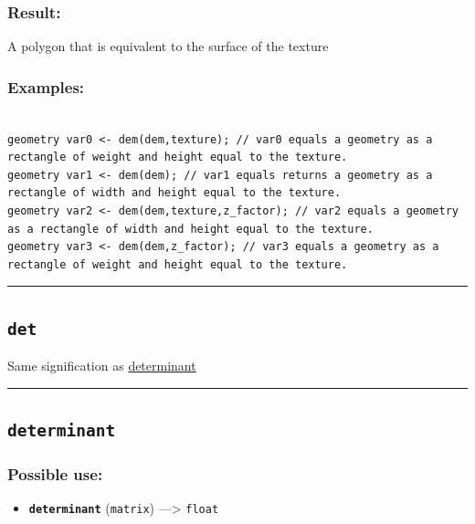 \documentclass[]{book}
\providecommand{\tightlist}{%
  \setlength{\itemsep}{0pt}\setlength{\parskip}{0pt}}
\theoremstyle{definition}
\theoremstyle{definition}
\theoremstyle{definition}
\theoremstyle{remark}
\begin{document}
\subsubsection{Result:}\label{result-124}

A polygon that is equivalent to the surface of the texture

\subsubsection{Examples:}\label{examples-98}

\begin{verbatim}
 
geometry var0 <- dem(dem,texture); // var0 equals a geometry as a rectangle of weight and height equal to the texture. 
geometry var1 <- dem(dem); // var1 equals returns a geometry as a rectangle of width and height equal to the texture. 
geometry var2 <- dem(dem,texture,z_factor); // var2 equals a geometry as a rectangle of width and height equal to the texture. 
geometry var3 <- dem(dem,z_factor); // var3 equals a geometry as a rectangle of weight and height equal to the texture.
\end{verbatim}

\begin{center}\rule{0.5\linewidth}{\linethickness}\end{center}

\subsection{\texorpdfstring{\texttt{det}}{det}}\label{det}

Same signification as
\href{operators-d-to-h.html\#determinant}{determinant}

\begin{center}\rule{0.5\linewidth}{\linethickness}\end{center}

\subsection{\texorpdfstring{\texttt{determinant}}{determinant}}\label{determinant}

\subsubsection{Possible use:}\label{possible-use-129}

\begin{itemize}
\tightlist
\item
  \textbf{\texttt{determinant}} (\texttt{matrix}) ---\textgreater{}
  \texttt{float}
\end{itemize}
\end{document}

